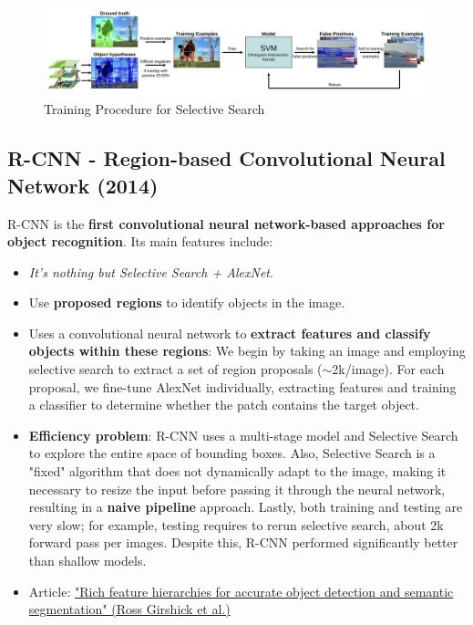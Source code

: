 \begin{figure}[!htbp]
    \centering
    \includegraphics[width=\linewidth]{tikz/chapter5 - Selective Search.png}
    \caption{Training Procedure for Selective Search}
\end{figure}


\subsection{R-CNN - Region-based Convolutional Neural Network (2014)}
R-CNN is the \textbf{first convolutional neural network-based approaches for object recognition}. Its main features include:

\begin{itemize}
    \item \textit{It's nothing but Selective Search + AlexNet}.
    \item Use \textbf{proposed regions} to identify objects in the image.
    \item Uses a convolutional neural network to \textbf{extract features and classify objects within these regions}: We begin by taking an image and employing selective search to extract a set of region proposals ($\sim$2k/image). For each proposal, we fine-tune AlexNet individually, extracting features and training a classifier to determine whether the patch contains the target object.
    \item \textbf{Efficiency problem}: R-CNN uses a multi-stage model and Selective Search to explore the entire space of bounding boxes. Also, Selective Search is a "fixed" algorithm that does not dynamically adapt to the image, making it necessary to resize the input before passing it through the neural network, resulting in a \textbf{naive pipeline} approach. Lastly, both training and testing are very slow; for example, testing requires to rerun selective search, about 2k forward pass per images. Despite this, R-CNN performed significantly better than shallow models.
    \item Article: \href{https://arxiv.org/pdf/1311.2524.pdf}{"Rich feature hierarchies for accurate object detection and semantic segmentation" (Ross Girshick et al.)}
\end{itemize}

